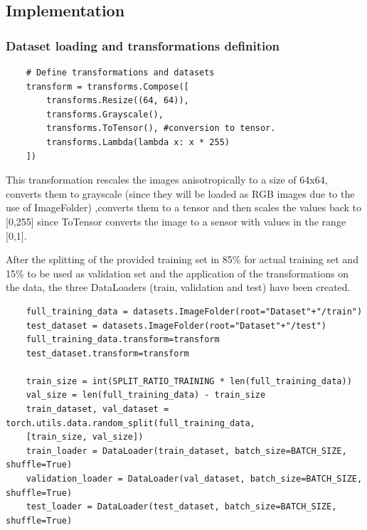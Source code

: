 \documentclass[12pt, a4paper, italian]{scrartcl}
\begin{document}
  \subsection{Implementation}
    \subsubsection{Dataset loading and transformations definition}
    \begin{verbatim}
    # Define transformations and datasets
    transform = transforms.Compose([
        transforms.Resize((64, 64)),
        transforms.Grayscale(),
        transforms.ToTensor(), #conversion to tensor.
        transforms.Lambda(lambda x: x * 255)
    ])

\end{verbatim}
This transformation rescales the images anisotropically to a size of 64x64, converts them to grayscale (since they will be loaded as RGB images due to the use of ImageFolder) ,converts them to a tensor and then scales the values back to [0,255] since ToTensor converts the image to a sensor with values in the range [0,1].\newline

After the splitting of the provided training set in 85\% for actual training set and 15\% to be used as validation set and the application of the transformations on the data, the three DataLoaders (train, validation and test) have been created.
   \begin{verbatim}
    full_training_data = datasets.ImageFolder(root="Dataset"+"/train")
    test_dataset = datasets.ImageFolder(root="Dataset"+"/test")
    full_training_data.transform=transform
    test_dataset.transform=transform

    train_size = int(SPLIT_RATIO_TRAINING * len(full_training_data))
    val_size = len(full_training_data) - train_size
    train_dataset, val_dataset = torch.utils.data.random_split(full_training_data, 
    [train_size, val_size])
    train_loader = DataLoader(train_dataset, batch_size=BATCH_SIZE, shuffle=True)
    validation_loader = DataLoader(val_dataset, batch_size=BATCH_SIZE, shuffle=True)
    test_loader = DataLoader(test_dataset, batch_size=BATCH_SIZE, shuffle=True)
\end{verbatim}
\end{document}
